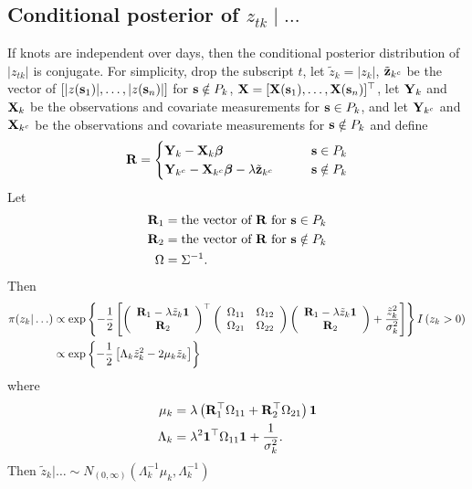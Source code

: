 \subsection*{Conditional posterior of $z_{tk} \mid \ldots $}\label{sts:mvcondu}
If knots are independent over days, then the conditional posterior distribution of $|z_{tk}|$ is conjugate.
For simplicity, drop the subscript $t$, let $\tilde{z}_{k} = |z_{k}|$, $\tilde{\mathbf{z}}_{k^c}$ be the vector of $[|z(\mathbf{s}_1)|, \ldots, |z(\mathbf{s}_n)|]$ for $\mathbf{s} \notin P_k$, $\mathbf{X} = [\mathbf{X}(\mathbf{s}_1), \ldots, \mathbf{X}(\mathbf{s}_n)]^\top$, let $\mathbf{Y}_k$ and $\mathbf{X}_k$ be the observations and covariate measurements for $\mathbf{s} \in P_k$, and let $\mathbf{Y}_{k^c}$ and $\mathbf{X}_{k^c}$ be the observations and covariate measurements for $\mathbf{s} \notin P_k$ and define
\begin{align*}
\mathbf{R} = \begin{cases}
        \mathbf{Y}_k - \mathbf{X}_k \mbox{\boldmath $\beta$} & \mathbf{s} \in P_k\\
        \mathbf{Y}_{k^c} - \mathbf{X}_{k^c} \mbox{\boldmath $\beta$} - \lambda \tilde{\mathbf{z}}_{k^c} \qquad & \mathbf{s} \notin P_k
        \end{cases}
\end{align*}
Let
\begin{align*}
    \mathbf{R}_1 &= \text{the vector of } \mathbf{R} \text{ for } \mathbf{s} \in P_k \\
    \mathbf{R}_2 &= \text{the vector of } \mathbf{R} \text{ for } \mathbf{s} \notin P_k \\
    \Omega &= \Sigma^{-1}.
\end{align*}
Then
\begin{align*}
    \pi(z_k | \ldots) &\propto \exp \left\{ -\frac{ 1 }{ 2 } \left[
        \left( \begin{array}{c}
            \mathbf{R}_1 - \lambda \tilde{z}_k \mathbf{1}\\
            \mathbf{R}_2
        \end{array} \right)^\top
        \left( \begin{array}{cc}
            \Omega_{11} & \Omega_{12}\\
            \Omega_{21} & \Omega_{22}
        \end{array} \right)
        \left( \begin{array}{c}
            \mathbf{R}_1 - \lambda \tilde{z}_k \mathbf{1}\\
            \mathbf{R}_2
        \end{array} \right)
        +  \frac{ {\tilde{z}_k}^2 }{ \sigma_k^2 }\right]
    \right\} I \left(z_k > 0 \right) \\
        &\propto \exp \left\{ -\frac{ 1 }{ 2 } \left[ \Lambda_k {\tilde{z}_k}^2 - 2 \mu_k \tilde{z}_k \right] \right\}
\end{align*}
where
\begin{align*}
    \mu_k &= \lambda \left( \mathbf{R}_1^\top \Omega_{11} + \mathbf{R}_2^\top \Omega_{21} \right)\mathbf{1}\\
    \Lambda_k &= \lambda^2 \mathbf{1}^\top \Omega_{11} \mathbf{1} + \frac{ 1 }{ \sigma^2_k }.
\end{align*}
Then $\tilde{z}_k | \ldots \sim N_{(0, \infty)} \left(\Lambda_k^{-1} \mu_k, \Lambda_k^{-1} \right)$

